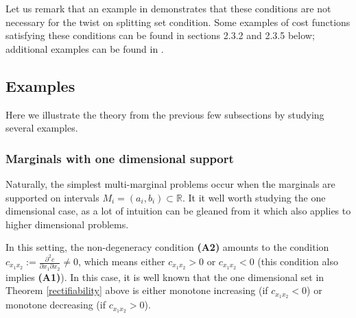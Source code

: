 \documentclass[letter,10pt]{article}
\theoremstyle{dotless}
\begin{document}
Let us remark that an example in \cite{P13a} demonstrates that these conditions are not necessary for the twist on splitting set condition.  Some examples of cost functions satisfying these conditions can be found in sections 2.3.2 and 2.3.5 below; additional examples can be found in \cite{P4}.

\subsection{Examples}
Here we illustrate the theory from the previous few subsections by studying several examples.
\subsubsection{Marginals with one dimensional support}
Naturally, the simplest multi-marginal problems occur when the marginals are supported on intervals $M_i=(a_i,b_i)  \subset \mathbb{R}$.  It it well worth studying the one dimensional case, as a lot of intuition can be gleaned from it which also applies to higher dimensional problems.

In this setting, the non-degeneracy condition \textbf{(A2)} amounts to the condition $c_{x_1x_2}:=\frac{\partial ^2 c}{\partial x_1 \partial x_2} \neq 0$, which means either $c_{x_1x_2} > 0$ or $c_{x_1x_2} < 0$ (this condition also implies \textbf{(A1)}).  In this case, it is well known that the one dimensional set in Theorem \ref{rectifiability} above is either monotone increasing (if  $c_{x_1x_2} < 0$) or monotone decreasing  (if  $c_{x_1x_2} >0$).  
\end{document}
